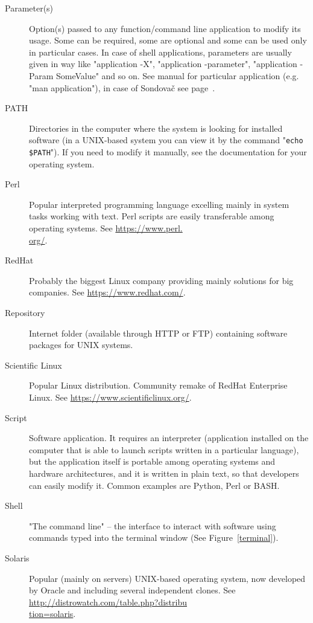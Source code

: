 \documentclass[a4paper, 11pt, twoside]{article}
\begin{document}
\begin{description}
  \item[Parameter(s)] Option(s) passed to any function/command line application to modify its usage. Some can be required, some are optional and some can be used only in particular cases. In case of shell applications, parameters are usually given in way like "application -X", "application -parameter", "application -Param SomeValue" and so on. See manual for particular application (e.g. "man application"), in case of Sondovač see page~\pageref{script-usage}.
  \item[PATH] Directories in the computer where the system is looking for installed software (in a UNIX-based system you can view it by the command "\texttt{echo \$PATH}"). If you need to modify it manually, see the documentation for your operating system.
  \item[Perl] Popular interpreted programming language excelling mainly in system tasks working with text. Perl scripts are easily transferable among operating systems. See \href{https://www.perl.org/}{https://www.perl.\\org/}.
  \item[RedHat] Probably the biggest Linux company providing mainly solutions for big companies. See \href{https://www.redhat.com/}{https://www.redhat.com/}.
  \item[Repository] Internet folder (available through HTTP or FTP) containing software packages for UNIX systems.
  \item[Scientific Linux] Popular Linux distribution. Community remake of RedHat Enterprise Linux. See \href{https://www.scientificlinux.org/}{https://www.scientificlinux.org/}.
  \item[Script] Software application. It requires an interpreter (application installed on the computer that is able to launch scripts written in a particular language), but the application itself is portable among operating systems and hardware architectures, and it is written in plain text, so that developers can easily modify it. Common examples are Python, Perl or BASH.
  \item[Shell] "The command line" -- the interface to interact with software using commands typed into the terminal window (See Figure~\ref{terminal}).
  \item[Solaris] Popular (mainly on servers) UNIX-based operating system, now developed by Oracle and including several independent clones. See \href{http://distrowatch.com/table.php?distribution=solaris}{http://distrowatch.com/table.php?distribu\\tion=solaris}.

\end{description}
\end{document}
